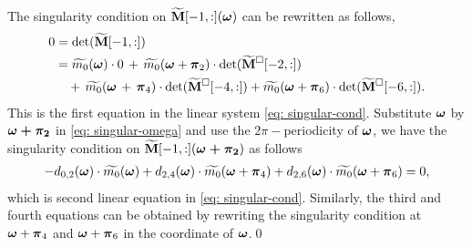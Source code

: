 The singularity condition on  $\widetilde{\mathbf{M}}[-1,:](\boldsymbol{\omega})$ can be rewritten as follows,
\begin{align}\label{eq: singular-omega}
0 &=\det(\widetilde{\mathbf{M}}[-1,:]) \notag\\
&= \widetilde{m_0}(\boldsymbol{\omega})\cdot 0 \,+\, \widetilde{m_0}(\boldsymbol{\omega}+\boldsymbol{\pi}_2)\cdot\det(\widetilde{\mathbf{M}}^{\Box}[-2,:])\notag\\
&\quad+ \,\widetilde{m_0}(\boldsymbol{\omega}\,+\,\boldsymbol{\pi}_4)\cdot\det(\widetilde{\mathbf{M}}^{\Box}[-4,:])
+ \widetilde{m_0}(\boldsymbol{\omega}+\boldsymbol{\pi}_6)\cdot\det(\widetilde{\mathbf{M}}^{\Box}[-6,:]). 
\end{align}
This is the first equation in the linear system \eqref{eq: singular-cond}. Substitute $\boldsymbol{\omega}$ by $\boldsymbol{\omega + \pi_2}$ in \eqref{eq: singular-omega} and use the $2\pi-$periodicity of $\boldsymbol{\omega}$, we have the singularity condition on $\widetilde{\mathbf{M}}[-1,:](\boldsymbol{\omega+\pi_2})$ as follows
\begin{align*}
-d_{0,2}(\boldsymbol{\omega})\cdot \widetilde{m_0}(\boldsymbol{\omega}) + d_{2,4}(\boldsymbol{\omega})\cdot \widetilde{m_0}(\boldsymbol{\omega}+\boldsymbol{\pi}_4) + d_{2,6}(\boldsymbol{\omega})\cdot\widetilde{m_0}(\boldsymbol{\omega}+\boldsymbol{\pi}_6) = 0,
\end{align*}
which is second linear equation in  \eqref{eq: singular-cond}.
Similarly, the third and fourth equations can be obtained by rewriting the singularity condition at $\boldsymbol{\omega}+\boldsymbol{\pi}_4$ and $\boldsymbol{\omega}+\boldsymbol{\pi}_6$ in the coordinate of $\boldsymbol{\omega}$.\qed

